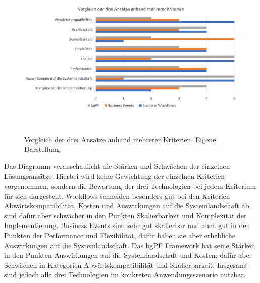 \begin{figure}[H]
 \centering
 \includegraphics[height=7.86cm]{Bilder/Entscheidungsmatrix_Diagramm.png}
 \caption[Vergleich der drei Ansätze anhand mehrerer Kriterien]{Vergleich der drei Ansätze anhand mehrerer Kriterien. Eigene Darstellung}
 \label{fig:iso_norm}
\end{figure}

Das Diagramm veranschaulicht die Stärken und Schwächen der einzelnen Lösungsansätze. Hierbei wird keine Gewichtung der einzelnen Kriterien vorgenommen, sondern die Bewertung der drei Technologien bei jedem Kriterium für sich dargestellt. Workflows schneiden besonders gut bei den Kriterien Abwärtskompatibilität, Kosten und Auswirkungen auf die Systemlandschaft ab, sind dafür aber schwächer in den Punkten Skalierbarkeit und Komplexität der Implementierung. Business Events sind sehr gut skalierbar und auch gut in den Punkten der Performance und Flexibilität, dafür haben sie aber erhebliche Auswirkungen auf die Systemlandschaft. Das bgPF Framework hat seine Stärken in den Punkten Auswirkungen auf die Systemlandschaft und Kosten, dafür aber Schwächen in Kategorien Abwärtskompatibilität und Skalierbarkeit. Insgesamt sind jedoch alle drei Technologien im konkreten Anwendungsszenario nutzbar.


